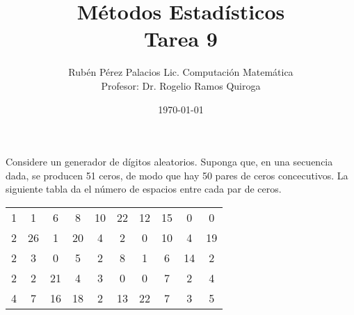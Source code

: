 \documentclass[letterpaper]{article}
\title{Métodos Estadísticos \\ Tarea 9}
\author{Rubén Pérez Palacios Lic. Computación Matemática\\Profesor: Dr. Rogelio Ramos Quiroga}
\date{\today}
\theoremstyle{definition}
\theoremstyle{lemathm}
\theoremstyle{lemathm}
\theoremstyle{lemathm}
\theoremstyle{lemademthm}
\newcommand{\1}{\mathbbm{1}}
\begin{document}
	\maketitle

	Considere un generador de dígitos aleatorios. Suponga que, en una secuencia dada, se producen 51 ceros, de modo que hay 50 pares de ceros concecutivos. La siguiente tabla da el número de espacios entre cada par de ceros.

	\begin{table*}[h!]
		\centering
		\begin{tabular}{|cccccccccc|}
			\hline
			1 & 1 & 6 & 8 & 10 & 22 & 12 & 15 & 0 & 0\\
			2 & 26 & 1 & 20 & 4 & 2 & 0 & 10 & 4 & 19\\
			2 & 3 & 0 & 5 & 2 & 8 & 1 & 6 & 14 & 2\\
			2 & 2 & 21 & 4 & 3 & 0 & 0 & 7 & 2 & 4\\
			4 & 7 & 16 & 18 & 2 & 13 & 22 & 7 & 3 & 5\\
			\hline
		\end{tabular}
	\end{table*}
\end{document}
